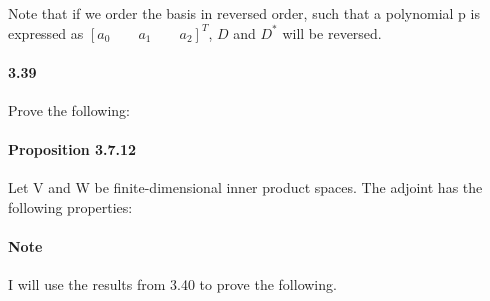 \documentclass[letterpaper,12pt]{article}
\theoremstyle{definition}
\begin{document}
Note that if we order the basis in reversed order, such that a polynomial p is expressed as $[a_0 \qquad a_1 \qquad a_2]^T$, $D$ and $D^*$ will be reversed.


\paragraph{3.39} Prove the following:

\paragraph{Proposition 3.7.12} Let V and W be finite-dimensional inner product spaces. The adjoint has the following properties:

\paragraph{Note} I will use the results from 3.40 to prove the following.
\end{document}

